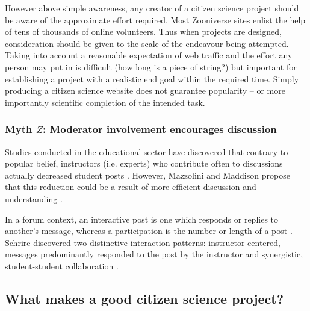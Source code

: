 \documentclass{sigchi}
\begin{document}
However above simple awareness, any creator of a citizen science project should be aware of the approximate effort required. Most Zooniverse sites enlist the help of tens of thousands of online volunteers. Thus when projects are designed, consideration should be given to the scale of the endeavour being attempted. Taking into account a reasonable expectation of web traffic and the effort any person may put in is difficult (how long is a piece of string?) but important for establishing a project with a realistic end goal within the required time. Simply producing a citizen science website does not guarantee popularity -- or more importantly scientific completion of the intended task.


\subsubsection{Myth $Z$: Moderator involvement encourages discussion}

Studies conducted in the educational sector have discovered that contrary to popular belief, instructors (i.e. experts) who contribute often to discussions actually decreased student posts \cite{zydney2012creating}. However, Mazzolini and Maddison propose that this reduction could be a result of more efficient discussion and understanding \cite{mazzolini2007jump}. 

In a forum context, an interactive post is one which responds or replies to another's message, whereas a participation is the number or length of a post \cite{schrire2006knowledge}. 
Schrire discovered two distinctive interaction patterns: instructor-centered, messages predominantly responded to the post by the instructor and synergistic, student-student collaboration \cite{schrire2006knowledge}. 

\subsection{What makes a good citizen science project?}
\end{document}
